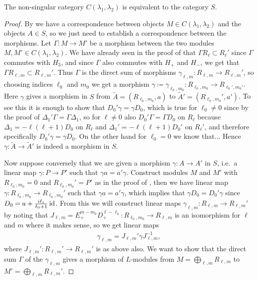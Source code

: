 \begin{theorem}\label{thm:nonsingcateq}
  The non-singular category $C(\lambda_1,\lambda_2)$ is equivalent to the category $S$.
\end{theorem}
\begin{proof}
  By  we have a correspondence between objects $M\in C(\lambda_1,\lambda_2)$ and the objects $A\in S$, so we just need to establish a correspondence between the morphisms. Let $\Gamma\colon M\to M'$ be a morphism between the two modules $M,M'\in C(\lambda_1,\lambda_2)$. We have already seen in the proof of  that $\Gamma R_\ell\subset R_\ell'$ since $\Gamma$ commutes with $H_3$, and since $\Gamma$ also commutes with $H_+$ and $H_-$, we get that $\Gamma R_{\ell,m}\subset R_{\ell,m}'$. Thus $\Gamma$ is the direct sum of morphisms $\gamma_{\ell,m}\colon R_{\ell,m}\to R_{\ell,m}'$, so choosing indices $\ell_0$ and $m_0$ we get a morphism $\gamma\coloneqq \gamma_{\ell_0,m_0}\colon R_{\ell_0,m_0}\to R_{\ell_0',m_0'}$. Here $\gamma$ gives a morphism in $S$ from $\widetilde{A}=(R_{\ell_0,m_0},a)$ to $\widetilde{A}'=(R_{\ell_0,m_0}',a')$. To see this it is enough to show that $D_0'\gamma = \gamma D_0$, which is true for $\ell_0\neq0$ since by the proof of  $\Delta_1'\Gamma=\Gamma\Delta_1$, so for $\ell\neq 0$ also $D_0'\Gamma=\Gamma D_0$ on $R_\ell$ because $\Delta_1=-\ell(\ell+1)D_0$ on $R_\ell$ and $\Delta_1'=-\ell(\ell+1)D_0'$ on $R_\ell'$, and therefore specifically $D_0' \gamma = \gamma D_0$. On the other hand for $\ell_0=0$ we know that... Hence $\gamma\colon \widetilde{A}\to \widetilde{A}'$ is indeed a morphism in $S$.

  Now suppose conversely that we are given a morphism $\gamma\colon A\to A'$ in $S$, i.e.\ a linear map $\gamma\colon P\to P'$ such that $\gamma a=a'\gamma$. Construct modules $M$ and $M'$ with $R_{\ell_0,m_0}=0$ and $R_{\ell_0,m_0}'=P'$ as in the proof of , then we have linear map $\gamma\colon R_{\ell_0,m_0}\to R_{\ell_0,m_0}'$ such that $\gamma a=a'\gamma$, which implies that $\gamma D_0=D_0'\gamma$ since $D_0=a+\tfrac{i\ell_1}{\ell_0+1}\operatorname{id}$. From this we will construct linear maps $\gamma_{\ell,m}\colon R_{\ell,m}\to R_{\ell,m}'$ by noting that $J_{\ell,m}=E_+^{m-m_0}D_+^{\ell-\ell_0}\colon R_{\ell_0,m_0}\to R_{\ell,m}$ is an isomorphism for $\ell$ and $m$ where it makes sense, so we get linear maps
  \begin{align}\label{eq:tempgammalm}
    \gamma_{\ell,m} = J_{\ell,m}' \gamma J_{\ell,m}^{-1},
  \end{align}
  where $J_{\ell,m}'\colon R_{\ell,m}'\to R_{\ell,m}'$ is as above also. We want to show that the direct sum $\Gamma$ of the $\gamma_{\ell,m}$ gives a morphism of $L$-modules from $M=\bigoplus_{\ell,m} R_{\ell,m}$ to $M'=\bigoplus_{\ell,m} R_{\ell,m}'$. 


\end{proof}

